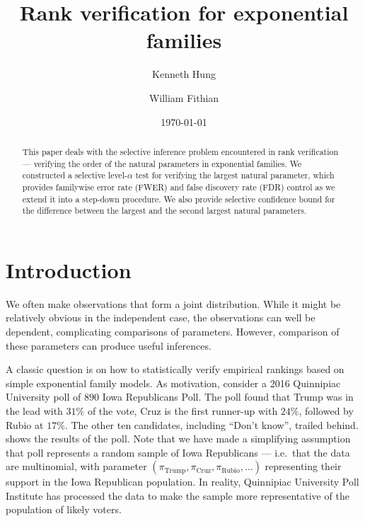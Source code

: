 \documentclass[11pt]{article}
\begin{document}
\title{Rank verification for exponential families}
\author{Kenneth Hung \and William Fithian}
\date{\today}
\maketitle

\begin{abstract}
This paper deals with the selective inference problem encountered in rank verification --- verifying the order of the natural parameters in exponential families. We constructed a selective level-$\alpha$ test for verifying the largest natural parameter, which provides familywise error rate (FWER) and false discovery rate (FDR) control as we extend it into a step-down procedure. We also provide selective confidence bound for the difference between the largest and the second largest natural parameters.
\end{abstract}

\section{Introduction}
\label{sec:introduction}

We often make observations that form a joint distribution. While it might be relatively obvious in the independent case, the observations can well be dependent, complicating comparisons of parameters. However, comparison of these parameters can produce useful inferences.

A classic question is on how to statistically verify empirical rankings based on simple exponential family models. As motivation, consider a 2016 Quinnipiac University poll of $890$ Iowa Republicans Poll. \cite{quinnipiac} The poll found that Trump was in the lead with $31\%$ of the vote, Cruz is the first runner-up with $24\%$, followed by Rubio at $17\%$. The other ten candidates, including ``Don't know'', trailed behind.  shows the results of the poll. Note that we have made a simplifying assumption that poll represents a random sample of Iowa Republicans --- i.e.\ that the data are multinomial, with parameter $\left(\pi_{\text{Trump}}, \pi_{\text{Cruz}}, \pi_{\text{Rubio}}, \ldots\right)$ representing their support in the Iowa Republican population. In reality, Quinnipiac University Poll Institute has processed the data to make the sample more representative of the population of likely voters.
\end{document}
